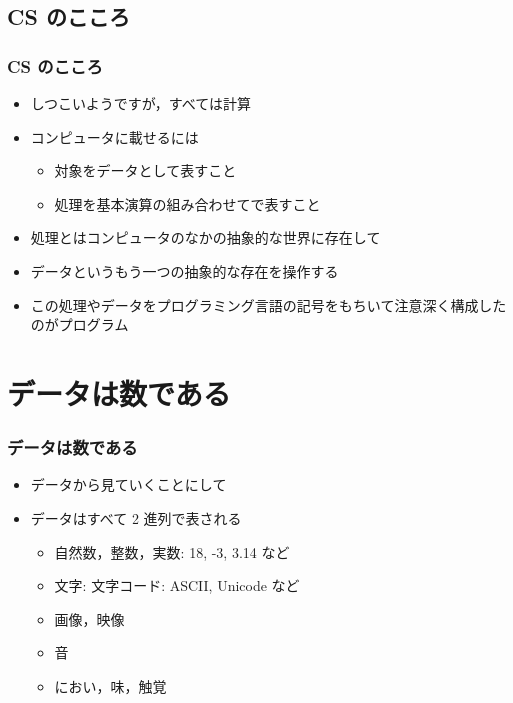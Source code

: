 \subsection{CS のこころ}
\begin{frame}
\frametitle{CS のこころ}
  \begin{itemize}
\item しつこいようですが，すべては計算
\item コンピュータに載せるには
    \begin{itemize}
\item 対象をデータとして表すこと
\item 処理を基本演算の組み合わせてで表すこと
    \end{itemize}
\item 処理とはコンピュータのなかの抽象的な世界に存在して
\item データというもう一つの抽象的な存在を操作する
\item この処理やデータをプログラミング言語の記号をもちいて注意深く構成したのがプログラム
  \end{itemize}
\end{frame}
%
%
\section{データは数である}
\begin{frame}
\frametitle{データは数である}
  \begin{itemize}
\item データから見ていくことにして
\item データはすべて 2 進列で表される
    \begin{itemize}
\item 自然数，整数，実数: 18, -3, 3.14 など
\item 文字: 文字コード: ASCII, Unicode など
\item 画像，映像
\item 音
\item におい，味，触覚
    \end{itemize}
  \end{itemize}
\end{frame}
%
%
